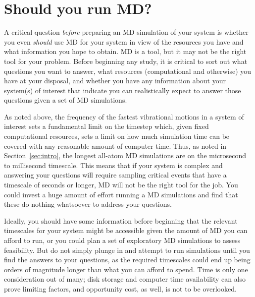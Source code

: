\documentclass[9pt,bestpractices]{livecoms}
\begin{document}
\section{Should you run MD?}

A critical question \emph{before} preparing an MD simulation of your system is whether you even \emph{should} use MD for your system in view of the resources you have and what information you hope to obtain.
MD is a tool, but it may not be the right tool for your problem.
Before beginning any study, it is critical to sort out what questions you want to answer, what resources (computational and otherwise) you have at your disposal, and whether you have any information about your system(s) of interest that indicate you can realistically expect to answer those questions given a set of MD simulations.

As noted above, the frequency of the fastest vibrational motions in a system of interest sets a fundamental limit on the timestep which, given fixed computational resources, sets a limit on how much simulation time can be covered with any reasonable amount of computer time.
Thus, as noted in Section~\ref{sec:intro}, the longest all-atom MD simulations are on the microsecond to millisecond timescale.
This means that if your system is complex and answering your questions will require sampling critical events that have a timescale of seconds or longer, MD will not be the right tool for the job.
You could invest a huge amount of effort running a MD simulations and find that these do nothing whatsoever to address your questions.

Ideally, you should have some information before beginning that the relevant timescales for your system might be accessible given the amount of MD you can afford to run, or you could plan a set of exploratory MD simulations to assess feasibility. 
But do not simply plunge in and attempt to run simulations until you find the answers to your questions, as the required timescales could end up being orders of magnitude longer than what you can afford to spend.
Time is only one consideration out of many; disk storage and computer time availability can also prove limiting factors, and opportunity cost, as well, is not to be overlooked.
\end{document}
